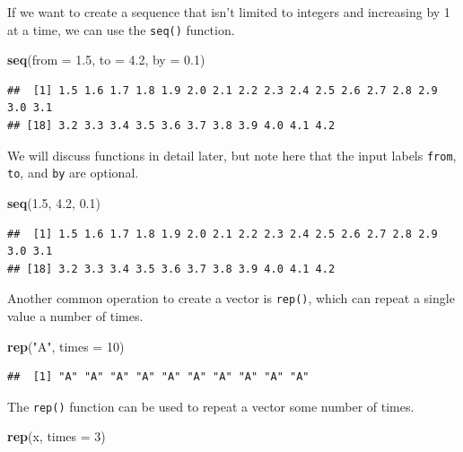 \documentclass[]{book}
\newenvironment{Shaded}{\begin{snugshade}}{\end{snugshade}}
\newcommand{\KeywordTok}[1]{\textcolor[rgb]{0.13,0.29,0.53}{\textbf{#1}}}
\newcommand{\DataTypeTok}[1]{\textcolor[rgb]{0.13,0.29,0.53}{#1}}
\newcommand{\DecValTok}[1]{\textcolor[rgb]{0.00,0.00,0.81}{#1}}
\newcommand{\FloatTok}[1]{\textcolor[rgb]{0.00,0.00,0.81}{#1}}
\newcommand{\StringTok}[1]{\textcolor[rgb]{0.31,0.60,0.02}{#1}}
\newcommand{\NormalTok}[1]{#1}
\theoremstyle{definition}
\theoremstyle{definition}
\theoremstyle{definition}
\theoremstyle{remark}
\begin{document}
If we want to create a sequence that isn't limited to integers and
increasing by 1 at a time, we can use the \texttt{seq()} function.

\begin{Shaded}
\begin{Highlighting}[]
\KeywordTok{seq}\NormalTok{(}\DataTypeTok{from =} \FloatTok{1.5}\NormalTok{, }\DataTypeTok{to =} \FloatTok{4.2}\NormalTok{, }\DataTypeTok{by =} \FloatTok{0.1}\NormalTok{)}
\end{Highlighting}
\end{Shaded}

\begin{verbatim}
##  [1] 1.5 1.6 1.7 1.8 1.9 2.0 2.1 2.2 2.3 2.4 2.5 2.6 2.7 2.8 2.9 3.0 3.1
## [18] 3.2 3.3 3.4 3.5 3.6 3.7 3.8 3.9 4.0 4.1 4.2
\end{verbatim}

We will discuss functions in detail later, but note here that the input
labels \texttt{from}, \texttt{to}, and \texttt{by} are optional.

\begin{Shaded}
\begin{Highlighting}[]
\KeywordTok{seq}\NormalTok{(}\FloatTok{1.5}\NormalTok{, }\FloatTok{4.2}\NormalTok{, }\FloatTok{0.1}\NormalTok{)}
\end{Highlighting}
\end{Shaded}

\begin{verbatim}
##  [1] 1.5 1.6 1.7 1.8 1.9 2.0 2.1 2.2 2.3 2.4 2.5 2.6 2.7 2.8 2.9 3.0 3.1
## [18] 3.2 3.3 3.4 3.5 3.6 3.7 3.8 3.9 4.0 4.1 4.2
\end{verbatim}

Another common operation to create a vector is \texttt{rep()}, which can
repeat a single value a number of times.

\begin{Shaded}
\begin{Highlighting}[]
\KeywordTok{rep}\NormalTok{(}\StringTok{"A"}\NormalTok{, }\DataTypeTok{times =} \DecValTok{10}\NormalTok{)}
\end{Highlighting}
\end{Shaded}

\begin{verbatim}
##  [1] "A" "A" "A" "A" "A" "A" "A" "A" "A" "A"
\end{verbatim}

The \texttt{rep()} function can be used to repeat a vector some number
of times.

\begin{Shaded}
\begin{Highlighting}[]
\KeywordTok{rep}\NormalTok{(x, }\DataTypeTok{times =} \DecValTok{3}\NormalTok{)}
\end{Highlighting}
\end{Shaded}
\end{document}
